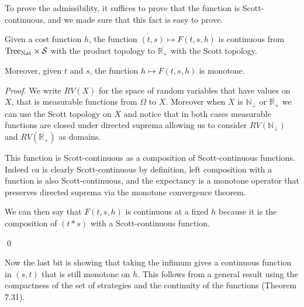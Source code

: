 To prove the admissibility, it suffices to prove that the function 
is Scott-continuous, and we made sure that this fact is easy to prove.

\begin{alemma}
    Given a cost function $h$, the function 
    $(t,s) \mapsto F(t,s,h)$ is continuous from $\textnormal{Tree}_{\textnormal{Nat}} \times
    \mathcal{S}$ with the product topology to $\overline{\mathbb{R}_+}$ with the 
    Scott topology.

    Moreover, given $t$ and $s$, the function $h \mapsto F(t,s,h)$ is monotone.
\end{alemma}

\begin{ensps}
\begin{proof}
    We write $RV(X)$ for the space of random variables 
    that have values on $X$, that is measurable 
    functions from $\Omega$ to $X$. Moreover when 
    $X$ is $\mathbb{N}_\bot$ or $\overline{\mathbb{R}_+}$
    we can use the Scott topology on $X$ and notice that in both cases 
    measurable functions are closed under directed suprema 
    allowing us to consider $RV(\mathbb{N}_\bot)$ and $RV(\overline{\mathbb{R}_+})$ as 
    domains.

    \begin{center}
    \end{center}

    This function is Scott-continuous as a composition of 
    Scott-continuous functions. Indeed $va$ is clearly Scott-continuous 
    by definition, left composition with a function is also
    Scott-continuous, and the expectancy is a monotone operator 
    that preserves directed suprema via the monotone convergence theorem. 

    We can then say that $F(t,s,h)$ is continuous at a fixed $h$
    because it is the composition of $(t*s)$ with a Scott-continuous 
    function.

    \qed
\end{proof}
\end{ensps}

Now the last bit is showing that taking the infimum gives 
a continuous function in $(s,t)$ that is still monotone on $h$.
This follows from a general result using the compactness of the 
set of strategies and the continuity of the functions 
\cite{AndreaShalk} (Theorem 7.31).

